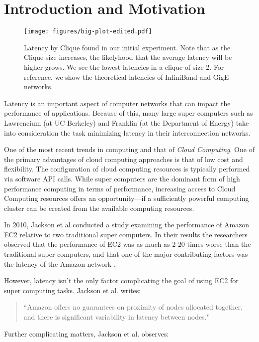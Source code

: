 \section{Introduction and Motivation} \label{sec:introduction}
\begin{figure*}[ht] 
  \centering
  \texttt{[image: figures/big-plot-edited.pdf]}
  \caption{Latency by Clique found in our initial experiment. Note that as the Clique size increases, the likelyhood that the average latency will be higher grows. We see the lowest latencies in a clique of size 2. For reference, we show the theoretical latencies of InfiniBand and GigE networks.}
  \label{fig:clique}
\end{figure*}

Latency is an important aspect of computer networks that can impact the performance of applications. Because of this, many large super computers such as Lawrencium (at UC Berkeley) and Franklin (at the Department of Energy) take into consideration the task minimizing latency in their interconnection networks.

One of the most recent trends in computing and that of \textit{Cloud Computing}. One of the primary advantages of cloud computing approaches is that of low cost and flexibility. The configuration of cloud computing resources is typically performed via software API calls. While super computers are the dominant form of high performance computing in terms of performance, increasing access to Cloud Computing resources offers an opportunity---if a sufficiently powerful computing cluster can be created from the available computing resources. 

In 2010, Jackson et al conducted a study examining the performance of Amazon EC2 relative to two traditional super computers. In their results the researchers observed that the performance of EC2 was as much as 2-20 times worse than the traditional super computers, and that one of the major contributing factors was the latency of the Amazon network \cite{jackson_performance_2010}.

However, latency isn't the only factor complicating the goal of using EC2 for super computing tasks. Jackson et al. writes:

\begin{quote}
  ``Amazon offers no guarantees on proximity of nodes allocated together, and there is significant variability in latency between nodes."
  \end{quote}

Further complicating matters, Jackson et al. observes:  

